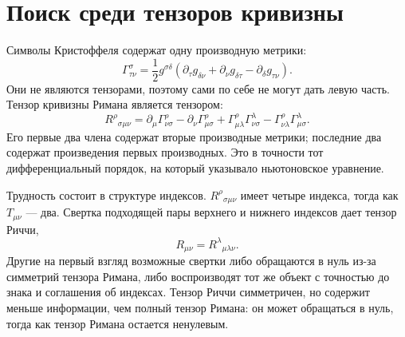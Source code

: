 \section{Поиск среди тензоров кривизны}

Символы Кристоффеля содержат одну производную метрики:
\begin{equation}
 \Gamma^\sigma_{\tau\nu}
 =
 \frac12 g^{\sigma\delta}
 \left(
 \partial_\tau g_{\delta\nu}
 +\partial_\nu g_{\delta\tau}
 -\partial_\delta g_{\tau\nu}
 \right).
 \label{eq:christoffel}
\end{equation}
Они не являются тензорами, поэтому сами по себе не могут дать левую часть. Тензор кривизны Римана является тензором:
\begin{equation}
 R^\rho{}_{\sigma\mu\nu}
 =
 \partial_\mu\Gamma^\rho_{\nu\sigma}
 -\partial_\nu\Gamma^\rho_{\mu\sigma}
 +\Gamma^\rho_{\mu\lambda}\Gamma^\lambda_{\nu\sigma}
 -\Gamma^\rho_{\nu\lambda}\Gamma^\lambda_{\mu\sigma}.
 \label{eq:riemann}
\end{equation}
Его первые два члена содержат вторые производные метрики; последние два содержат произведения первых производных. Это в точности тот дифференциальный порядок, на который указывало ньютоновское уравнение.

Трудность состоит в структуре индексов. \(R^\rho{}_{\sigma\mu\nu}\) имеет четыре индекса, тогда как \(T_{\mu\nu}\) — два. Свертка подходящей пары верхнего и нижнего индексов дает тензор Риччи,
\begin{equation}
 R_{\mu\nu}=R^\lambda{}_{\mu\lambda\nu}.
 \label{eq:ricci}
\end{equation}
Другие на первый взгляд возможные свертки либо обращаются в нуль из-за симметрий тензора Римана, либо воспроизводят тот же объект с точностью до знака и соглашения об индексах. Тензор Риччи симметричен, но содержит меньше информации, чем полный тензор Римана: он может обращаться в нуль, тогда как тензор Римана остается ненулевым.

\begin{classroomqa}
\end{classroomqa}

